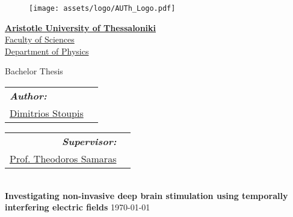 \begin{titlepage}
\begin{figure}[H]
    \centering
    \texttt{[image: assets/logo/AUTh\_Logo.pdf]}
    \label{fig:cover_auth_logo}
\end{figure}

\centering
\Large \href{https://www.auth.gr/}{\textbf{Aristotle University of Thessaloniki}}\\
\large \href{http://www.sci.auth.gr/}{Faculty of Sciences}\\
\large \href{https://www.physics.auth.gr/}{Department of Physics}

\vspace{18pt}

\large Bachelor Thesis
\vspace{12pt}

\begin{minipage}[t]{0.5\textwidth}
    \raggedright
    \begin{tabular}{ll}
        \textit{\textbf{Author:}} & \\
        \href{https://gitlab.com/dimst23}{Dimitrios Stoupis}\footnotemark[1] & \\
    \end{tabular}
\end{minipage}
\begin{minipage}[t]{0.49\textwidth}
    \raggedleft
    \begin{tabular}{rr}
        \textit{\textbf{Supervisor:}} & \\
        \href{http://users.auth.gr/theosama/}{Prof. Theodoros Samaras}\footnotemark[2] & \\
    \end{tabular}
\end{minipage}


\noindent\makebox[\linewidth]{\rule{\textwidth}{0.5pt}}\\[0.2cm]
\LARGE{\textbf{Investigating non-invasive deep brain stimulation using
temporally interfering electric fields}}
\noindent\makebox[\linewidth]{\rule{\textwidth}{0.5pt}}\vspace{0.2cm}
\vspace{8pt}
\large\today


\end{titlepage}

